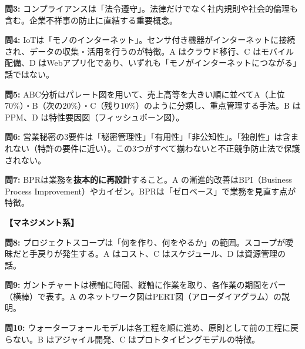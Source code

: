 \begin{kaisetsu}
\textbf{問3:} コンプライアンスは「法令遵守」。法律だけでなく社内規則や社会的倫理も含む。企業不祥事の防止に直結する重要概念。
\end{kaisetsu}

\begin{kaisetsu}
\textbf{問4:} IoTは「モノのインターネット」。センサ付き機器がインターネットに接続され、データの収集・活用を行うのが特徴。A はクラウド移行、C はモバイル配備、D はWebアプリ化であり、いずれも「モノがインターネットにつながる」話ではない。
\end{kaisetsu}

\begin{kaisetsu}
\textbf{問5:} ABC分析はパレート図を用いて、売上高等を大きい順に並べてA（上位70\%）・B（次の20\%）・C（残り10\%）のように分類し、重点管理する手法。B はPPM、D は特性要因図（フィッシュボーン図）。
\end{kaisetsu}

\begin{kaisetsu}
\textbf{問6:} 営業秘密の3要件は「秘密管理性」「有用性」「非公知性」。「独創性」は含まれない（特許の要件に近い）。この3つがすべて揃わないと不正競争防止法で保護されない。
\end{kaisetsu}

\begin{kaisetsu}
\textbf{問7:} BPRは業務を\textbf{抜本的に再設計}すること。A の漸進的改善はBPI（Business Process Improvement）やカイゼン。BPRは「ゼロベース」で業務を見直す点が特徴。
\end{kaisetsu}

\vspace{0.5em}
\noindent\textbf{【マネジメント系】}

\begin{kaisetsu}
\textbf{問8:} プロジェクトスコープは「何を作り、何をやるか」の範囲。スコープが曖昧だと手戻りが発生する。A はコスト、C はスケジュール、D は資源管理の話。
\end{kaisetsu}

\begin{kaisetsu}
\textbf{問9:} ガントチャートは横軸に時間、縦軸に作業を取り、各作業の期間をバー（横棒）で表す。A のネットワーク図はPERT図（アローダイアグラム）の説明。
\end{kaisetsu}

\begin{kaisetsu}
\textbf{問10:} ウォーターフォールモデルは各工程を順に進め、原則として前の工程に戻らない。B はアジャイル開発、C はプロトタイピングモデルの特徴。
\end{kaisetsu}

